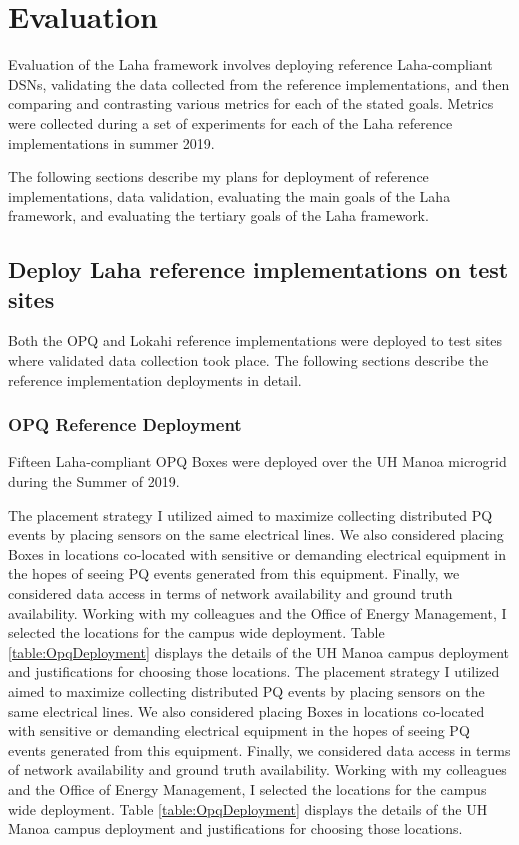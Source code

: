 \chapter{Evaluation}\label{ch:evaluation}
Evaluation of the Laha framework involves deploying reference Laha-compliant DSNs, validating the data collected from the reference implementations, and then comparing and contrasting various metrics for each of the stated goals. Metrics were collected during a set of experiments for each of the Laha reference implementations in summer 2019.

The following sections describe my plans for deployment of reference implementations, data validation, evaluating the main goals of the Laha framework, and evaluating the tertiary goals of the Laha framework.

\section{Deploy Laha reference implementations on test sites}\label{sec:deploy-laha-reference-implementations-on-test-sites}
Both the OPQ and Lokahi reference implementations were deployed to test sites where validated data collection took place. The following sections describe the reference implementation deployments in detail.

\subsection{OPQ Reference Deployment}\label{subsec:opq-reference-deployment}
Fifteen Laha-compliant OPQ Boxes were deployed over the UH Manoa microgrid during the Summer of 2019.

The placement strategy I utilized aimed to maximize collecting distributed PQ events by placing sensors on the same electrical lines. We also considered placing Boxes in locations co-located with sensitive or demanding electrical equipment in the hopes of seeing PQ events generated from this equipment. Finally, we considered data access in terms of network availability and ground truth availability. Working with my colleagues and the Office of Energy Management, I selected the locations for the campus wide deployment. Table \ref{table:OpqDeployment} displays the details of the UH Manoa campus deployment and justifications for choosing those locations.
The placement strategy I utilized aimed to maximize collecting distributed PQ events by placing sensors on the same electrical lines. We also considered placing Boxes in locations co-located with sensitive or demanding electrical equipment in the hopes of seeing PQ events generated from this equipment. Finally, we considered data access in terms of network availability and ground truth availability. Working with my colleagues and the Office of Energy Management, I selected the locations for the campus wide deployment. Table \ref{table:OpqDeployment} displays the details of the UH Manoa campus deployment and justifications for choosing those locations.

